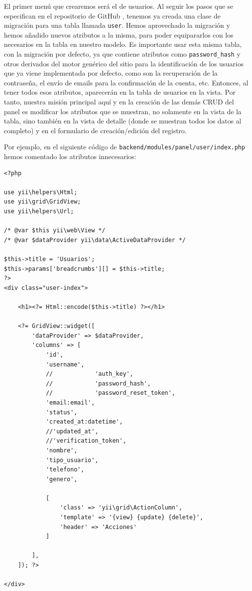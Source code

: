 El primer menú que crearemos será el de usuarios. Al seguir los pasos que se especifican en el repositorio de GitHub \cite{yii2advanced}, tenemos ya creada una clase de migración para una tabla llamada \texttt{user}. Hemos aprovechado la migración y hemos añadido nuevos atributos a la misma, para poder equipararlos con los necesarios en la tabla en nuestro modelo. Es importante usar esta misma tabla, con la migración por defecto, ya que contiene atributos como \texttt{password\_hash} y otros derivados del motor genérico del sitio para la identificación de los usuarios que ya viene implementada por defecto, como son la recuperación de la contraseña, el envío de emails para la confirmación de la cuenta, etc. Entonces, al tener todos esos atributos, aparecerán en la tabla de usuarios en la vista. Por tanto, nuestra misión principal aquí y en la creación de las demás CRUD del panel es modificar los atributos que se muestran, no solamente en la vista de la tabla, sino también en la vista de detalle (donde se muestran todos los datos al completo) y en el formulario de creación/edición del registro.

Por ejemplo, en el siguiente código de \texttt{backend/modules/panel/user/index.php} hemos comentado los atributos innecesarios:

\begin{verbatim}
<?php

use yii\helpers\Html;
use yii\grid\GridView;
use yii\helpers\Url;

/* @var $this yii\web\View */
/* @var $dataProvider yii\data\ActiveDataProvider */

$this->title = 'Usuarios';
$this->params['breadcrumbs'][] = $this->title;
?>
<div class="user-index">
	
	<h1><?= Html::encode($this->title) ?></h1>
	
	<?= GridView::widget([
		'dataProvider' => $dataProvider,
		'columns' => [
			'id',
			'username',
			//            'auth_key',
			//            'password_hash',
			//            'password_reset_token',
			'email:email',
			'status',
			'created_at:datetime',
			//'updated_at',
			//'verification_token',
			'nombre',
			'tipo_usuario',
			'telefono',
			'genero',
		
			[
				'class' => 'yii\grid\ActionColumn',
				'template' => '{view} {update} {delete}',
				'header' => 'Acciones'
			]
	
		],
	]); ?>

</div>

\end{verbatim}

